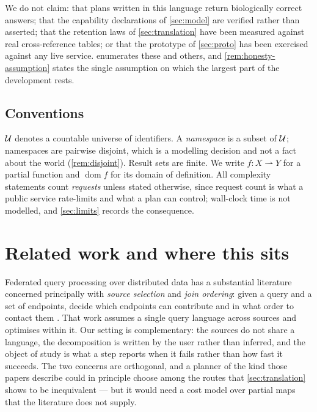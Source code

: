 We do not claim: that plans written in this language return biologically
correct answers; that the capability declarations of \cref{sec:model} are
verified rather than asserted; that the retention laws of
\cref{sec:translation} have been measured against real cross-reference tables;
or that the prototype of \cref{sec:proto} has been exercised against any live
service.  enumerates these and others, and
\cref{rem:honesty-assumption} states the single assumption on which the largest
part of the development rests.

\subsection{Conventions}

$\mathcal{U}$ denotes a countable universe of identifiers. A \emph{namespace} is a
subset of $\mathcal{U}$; namespaces are pairwise disjoint, which is a modelling
decision and not a fact about the world (\cref{rem:disjoint}). Result sets are
finite. We write $f : X \rightharpoonup Y$ for a partial function and
$\operatorname{dom} f$ for its domain of definition. All complexity statements
count \emph{requests} unless stated otherwise, since request count is what a
public service rate-limits and what a plan can control; wall-clock time is not
modelled, and \cref{sec:limits} records the consequence.

\section{Related work and where this sits}
\label{sec:related}

Federated query processing over distributed data has a substantial literature
concerned principally with \emph{source selection} and \emph{join ordering}:
given a query and a set of endpoints, decide which endpoints can contribute and
in what order to contact them \citep{Schwarte2011,Gorlitz2011,Acosta2011,Saleem2016,Rakhmawati2013}.
That work assumes a single query language across sources and optimises within
it. Our setting is complementary: the sources do not share a language, the
decomposition is written by the user rather than inferred, and the object of
study is what a step reports when it fails rather than how fast it succeeds.
The two concerns are orthogonal, and a planner of the kind those papers
describe could in principle choose among the routes that \cref{sec:translation}
shows to be inequivalent --- but it would need a cost model over partial maps
that the literature does not supply.

